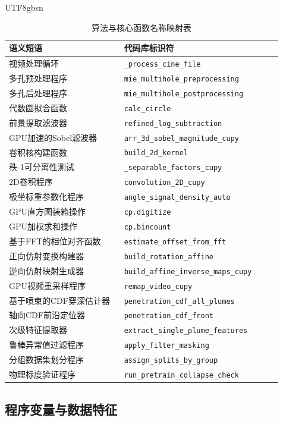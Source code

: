 \documentclass[english, 12pt, a4paper, elec, utf8, a-2b, online]{aaltothesis}
\begin{document}
\begin{CJK*}{UTF8}{gbsn}
\begin{table}[h]
\centering
\begin{tabular}{p{0.4\linewidth} p{0.55\linewidth}}
\toprule
\textbf{语义短语} & \textbf{代码库标识符} \\
\midrule
视频处理循环 & \texttt{\_process\_cine\_file} \\
多孔预处理程序 & \texttt{mie\_multihole\_preprocessing} \\
多孔后处理程序 & \texttt{mie\_multihole\_postprocessing} \\
代数圆拟合函数 & \texttt{calc\_circle} \\
前景提取滤波器 & \texttt{refined\_log\_subtraction} \\
GPU加速的Sobel滤波器 & \texttt{arr\_3d\_sobel\_magnitude\_cupy} \\
卷积核构建函数 & \texttt{build\_2d\_kernel} \\
秩-1可分离性测试 & \texttt{\_separable\_factors\_cupy} \\
2D卷积程序 & \texttt{convolution\_2D\_cupy} \\
极坐标重参数化程序 & \texttt{angle\_signal\_density\_auto} \\
GPU直方图装箱操作 & \texttt{cp.digitize} \\
GPU加权求和操作 & \texttt{cp.bincount} \\
基于FFT的相位对齐函数 & \texttt{estimate\_offset\_from\_fft} \\
正向仿射变换构建器 & \texttt{build\_rotation\_affine} \\
逆向仿射映射生成器 & \texttt{build\_affine\_inverse\_maps\_cupy} \\
GPU视频重采样程序 & \texttt{remap\_video\_cupy} \\
基于喷束的CDF穿深估计器 & \texttt{penetration\_cdf\_all\_plumes} \\
轴向CDF前沿定位器 & \texttt{penetration\_cdf\_front} \\
次级特征提取器 & \texttt{extract\_single\_plume\_features} \\
鲁棒异常值过滤程序 & \texttt{apply\_filter\_masking} \\
分组数据集划分程序 & \texttt{assign\_splits\_by\_group} \\
物理标度验证程序 & \texttt{run\_pretrain\_collapse\_check} \\
\bottomrule
\end{tabular}
\caption{算法与核心函数名称映射表}
\end{table}

\subsection{程序变量与数据特征}


\end{CJK*}
\end{document}

